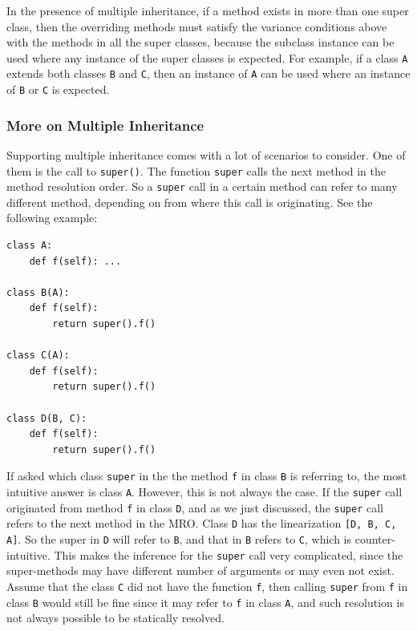 In the presence of multiple inheritance, if a method exists in more than one super class, then the overriding methods must satisfy the variance conditions above with the methods in all the super classes, because the subclass instance can be used where any instance of the super classes is expected. For example, if a class \lstinline|A| extends both classes \lstinline|B| and \lstinline|C|, then an instance of \lstinline|A| can be used where an instance of \lstinline|B| or \lstinline|C| is expected.

\subsubsection{More on Multiple Inheritance}
Supporting multiple inheritance comes with a lot of scenarios to consider. One of them is the call to \lstinline|super()|. The function \lstinline|super| calls the next method in the method resolution order. So a \lstinline|super| call in a certain method can refer to many different method, depending on from where this call is originating. See the following example:
\begin{lstlisting}
class A:
	def f(self): ...
		
class B(A):
	def f(self):
		return super().f()
	
class C(A):
	def f(self):
		return super().f()

class D(B, C):
	def f(self):
		return super().f()
\end{lstlisting}

If asked which class \lstinline|super| in the the method \lstinline|f| in class \lstinline|B| is referring to, the most intuitive answer is class \lstinline|A|. However, this is not always the case. If the \lstinline|super| call originated from method \lstinline|f| in class \lstinline|D|, and as we just discussed, the \lstinline|super| call refers to the next method in the MRO. Class \lstinline|D| has the linearization \lstinline|[D, B, C, A]|. So the super in \lstinline|D| will refer to \lstinline|B|, and that in \lstinline|B| refers to \lstinline|C|, which is counter-intuitive. This makes the inference for the \lstinline|super| call very complicated, since the super-methods may have different number of arguments or may even not exist. Assume that the class \lstinline|C| did not have the function \lstinline|f|, then calling \lstinline|super| from \lstinline|f| in class \lstinline|B| would still be fine since it may refer to \lstinline|f| in class \lstinline|A|, and such resolution is not always possible to be statically resolved.\\

